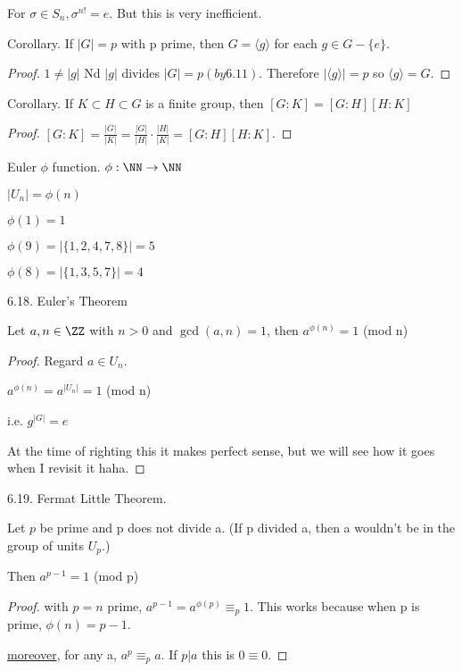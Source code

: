 \documentclass[class=scrartcl, crop=false]{standalone}
\begin{document}
\begin{example}
  For $\sigma \in S_n, \sigma^{n!} = e$. But this is very inefficient.
\end{example}

\begin{theorem}
  Corollary. If $|G| = p$ with p prime, then $G = \langle g \rangle $ for each $g \in G - \{e\}$.
  \begin{proof}
    $1 \neq |g|$ Nd $|g|$ divides $|G| = p (by 6.11)$. Therefore $|\langle g \rangle | = p$ so $\langle g \rangle = G$.
  \end{proof}
\end{theorem}

\begin{theorem}
  Corollary. If $K \subset H \subset G$ is a finite group, then $\left[G:K\right] = \left[G:H\right]\left[H:K\right]$

   \begin{proof}
     $\left[G:K\right] = \frac{|G|}{|K|} = \frac{|G|}{|H|} \cdot \frac{|H|}{|K|} = \left[G:H\right]\left[H:K\right]$.
  \end{proof}
\end{theorem}

\begin{definition}
  Euler $\phi$ function. $\phi:\NN\to\NN$

  $|U_n| = \phi(n)$
   \begin{example}
     $\phi(1) = 1$ 

     $\phi(9) = |\{1, 2, 4, 7, 8\}| = 5$ 

     $\phi(8) = |\{1, 3, 5, 7\}| = 4$
  \end{example}
\end{definition}

\begin{theorem}
  6.18. Euler's Theorem

  Let $a, n \in \ZZ$ with $n > 0$ and $\gcd(a, n) = 1$, then $a^{\phi(n)} = 1$ (mod n)

  \begin{proof}
    Regard $a \in U_n$.

    $a^{\phi(n)} = a^{|U_n|} = 1$ (mod n)
    
    i.e. $g^{|G|} = e$

    At the time of righting this it makes perfect sense, but we will see how it goes when I revisit it haha.
  \end{proof}
\end{theorem}

\begin{theorem}
  6.19. Fermat Little Theorem.

  Let $p$ be prime and p does not divide a. (If p divided a, then a wouldn't be in the group of units $U_p$.)

  Then $a^{p - 1} = 1$ (mod p)

  \begin{proof}
    with $p = n$ prime, $a^{p - 1} = a^{\phi(p)} \equiv_p 1$. This works because when p is prime, $\phi(n) = p - 1$.

    \ul{moreover}, for any a, $a^p \equiv_p a$. If $p | a$ this is $0 \equiv 0$.
  \end{proof}
\end{theorem}
\end{document}
